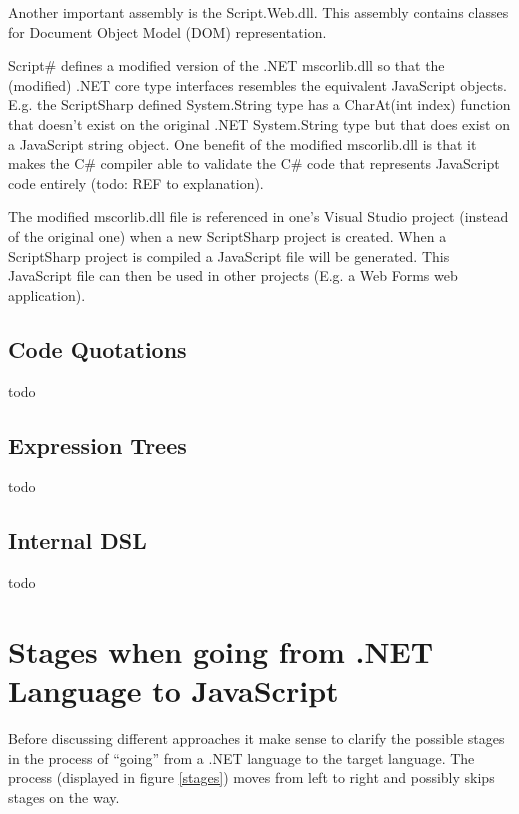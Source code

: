 		Another important assembly is the Script.Web.dll. This assembly contains classes for Document Object Model (DOM) representation.

		Script\# defines a modified version of the .NET mscorlib.dll so that the (modified) .NET core type interfaces resembles the equivalent JavaScript objects. E.g. the ScriptSharp defined System.String type has a CharAt(int index) function that doesn’t exist on the original .NET System.String type but that does exist on a JavaScript string object. One benefit of the modified mscorlib.dll is that it makes the C\# compiler able to validate the C\# code that represents JavaScript code entirely (todo: REF to explanation). 

		The modified mscorlib.dll file is referenced in one’s Visual Studio project (instead of the original one) when a new ScriptSharp project is created. When a ScriptSharp project is compiled a JavaScript file will be generated. This JavaScript file can then be used in other projects (E.g. a Web Forms web application).

	



	\subsection{Code Quotations} %
	\label{ssub:code_quotations}
		todo

	\subsection{Expression Trees} %
	\label{ssub:expression_trees}
		todo

	\subsection{Internal DSL} %
	\label{ssub:internal_dsl}
		todo

\section{Stages when going from .NET Language to JavaScript} %
\label{sec:stages_when_going_from_net_language_to_javascript}
	Before discussing different approaches it make sense to clarify the possible stages in the process of ``going'' from a .NET language to the target language. The process (displayed in figure \ref{stages}) moves from left to right and possibly skips stages on the way.

